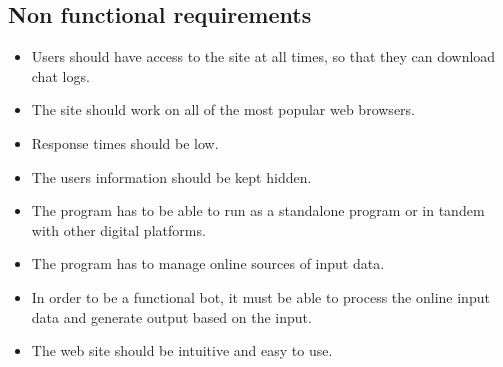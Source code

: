 \subsection{Non functional requirements}

\begin{itemize}
    \item Users should have access to the site at all times, so that they can download chat logs.
    \item The site should work on all of the most popular web browsers.
    \item Response times should be low.
    \item The users information should be kept hidden.
    \item The program has to be able to run as a standalone
program or in tandem with other digital platforms.
    \item The program has to manage online sources of input data.
    \item In order to be a functional bot, it must be able to process the online
input data and generate output based on the input.
    \item The web site should be intuitive and easy to use.
\end{itemize}
